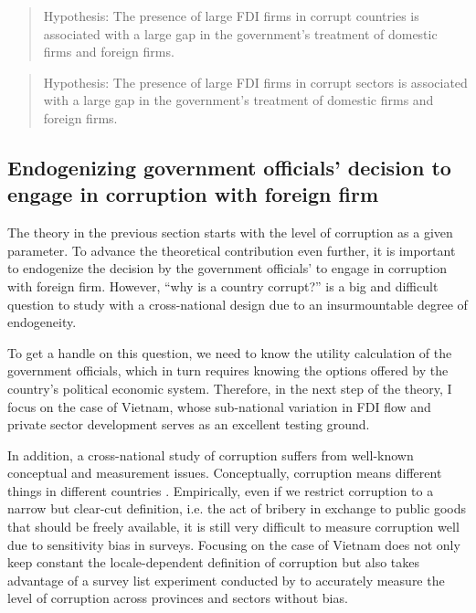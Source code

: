 \begin{quote}
Hypothesis: The presence of large FDI firms in corrupt countries is associated with a large gap in the government's treatment of domestic firms and foreign firms.
\end{quote}

\begin{quote}
Hypothesis: The presence of large FDI firms in corrupt sectors is associated with a large gap in the government's treatment of domestic firms and foreign firms.
\end{quote}

\subsection{Endogenizing government officials' decision to engage in corruption with foreign firm}

The theory in the previous section starts with the level of corruption as a given parameter. To advance the theoretical contribution even further, it is important to endogenize the decision by the government officials' to engage in corruption with foreign firm. However, ``why is a country corrupt?'' is a big and difficult question to study with a cross-national design due to an insurmountable degree of endogeneity. 

To get a handle on this question, we need to know the utility calculation of the government officials, which in turn requires knowing the options offered by the country's political economic system. Therefore, in the next step of the theory, I focus on the case of Vietnam, whose sub-national variation in FDI flow and private sector development serves as an excellent testing ground.

In addition, a cross-national study of corruption suffers from well-known conceptual and measurement issues. Conceptually, corruption means different things in different countries \citep{Rosen2010}. Empirically, even if we restrict corruption to a narrow but clear-cut definition, i.e. the act of bribery in exchange to public goods that should be freely available, it is still very difficult to measure corruption well due to sensitivity bias in surveys. Focusing on the case of Vietnam does not only keep constant the locale-dependent definition of corruption but also takes advantage of a survey list experiment conducted by \citet{Malesky2015} to accurately measure the level of corruption across provinces and sectors without bias.

